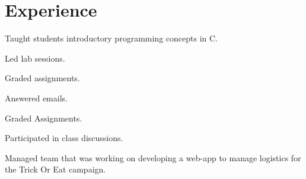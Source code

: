\documentclass[letterpaper]{deedy-resume} %
\begin{document}
\begin{minipage}[t]{0.66\textwidth} %


\section{Experience}


\vspace{\topsep} %
\begin{tightitemize}
\item Taught students introductory programming concepts in C.
\item Led lab sessions.
\item Graded assignments.
\end{tightitemize}

\sectionspace %



\begin{tightitemize}
\item Answered emails.
\item Graded Assignments.
\item Participated in class discussions.
\end{tightitemize}

\sectionspace %


\begin{tightitemize}
\item Managed team that was working on developing a web-app to manage logistics for the Trick Or Eat campaign.
\end{tightitemize}

\sectionspace %


\end{minipage}
\end{document}
